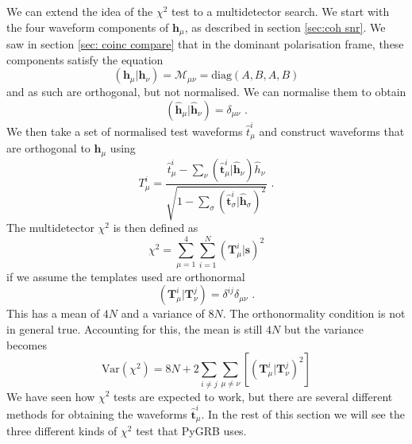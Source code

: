 \documentclass[11pt]{cuthesis}
\newcommand{\mn}{_{\mu\nu}}
\newcommand{\fs}{\text{ .}}
\begin{document}
We can extend the idea of the $\chi^2$ test to a multidetector search. We start with the four waveform components of $\textbf{h}_\mu$, as described in section \ref{sec:coh snr}. We saw in section \ref{sec: coinc compare} that in the dominant polarisation frame, these components satisfy the equation
\begin{equation}
( \textbf{h}_\mu | \textbf{h}_\nu ) = \mathcal{M}\mn = \text{diag}(A,B,A,B)
\end{equation}
and as such are orthogonal, but not normalised. We can normalise them to obtain 
\begin{equation}
(\hat{\textbf{h}}_\mu |\hat{\textbf{h}}_\nu ) = \delta\mn \fs
\end{equation}
We then take a set of normalised test waveforms $\hat{t}^i_\mu$ and construct waveforms that are orthogonal to $\hat{\textbf{h}}_\mu$ using
\begin{equation}
T^i_\mu = \frac{\hat{t}^i_\mu - \sum_\nu(\hat{\textbf{t}}^i_\mu | \hat{\textbf{h}}_\nu)\hat{h}_\nu}{\sqrt{1-\sum_\sigma(\hat{\textbf{t}}^i_\sigma|\hat{\textbf{h}}_\sigma)^2}} \fs
\end{equation}
The multidetector $\chi^2$ is then defined as
\begin{equation} \label{coh chisq}
\chi^2 = \sum_{\mu=1}^4 \sum_{i=1}^N (\textbf{T}^i_\mu | \textbf{s})^2 
\end{equation}
if we assume the templates used are orthonormal
\begin{equation}
( \textbf{T}^i_\mu | \textbf{T}^j_\nu ) = \delta^{ij}\delta\mn \fs
\end{equation}
This has a mean of $4N$ and a variance of $8N$. The orthonormality condition is not in general true. Accounting for this, the mean is still $4N$ but the variance becomes
\begin{equation} \label{coh chisq var}
\text{Var}(\chi^2) = 8N + 2\sum_{i \neq j} \sum_{\mu\neq\nu} [(\textbf{T}^i_\mu | \textbf{T}^j_\nu)^2 ] 
\end{equation}
We have seen how $\chi^2$ tests are expected to work, but there are several different methods for obtaining the waveforms $\hat{\textbf{t}}^i_\mu$. In the rest of this section we will see the three different kinds of $\chi^2$ test that PyGRB uses.
\end{document}
